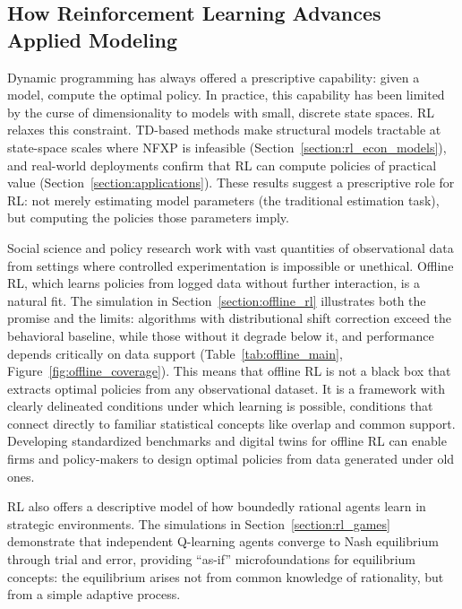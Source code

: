 \subsection{How Reinforcement Learning Advances Applied Modeling}

Dynamic programming has always offered a prescriptive capability: given a model, compute the optimal policy. In practice, this capability has been limited by the curse of dimensionality to models with small, discrete state spaces. RL relaxes this constraint. TD-based methods make structural models tractable at state-space scales where NFXP is infeasible (Section~\ref{section:rl_econ_models}), and real-world deployments confirm that RL can compute policies of practical value (Section~\ref{section:applications}). These results suggest a prescriptive role for RL: not merely estimating model parameters (the traditional estimation task), but computing the policies those parameters imply.

Social science and policy research work with vast quantities of observational data from settings where controlled experimentation is impossible or unethical. Offline RL, which learns policies from logged data without further interaction, is a natural fit. The simulation in Section~\ref{section:offline_rl} illustrates both the promise and the limits: algorithms with distributional shift correction exceed the behavioral baseline, while those without it degrade below it, and performance depends critically on data support (Table~\ref{tab:offline_main}, Figure~\ref{fig:offline_coverage}). This means that offline RL is not a black box that extracts optimal policies from any observational dataset. It is a framework with clearly delineated conditions under which learning is possible, conditions that connect directly to familiar statistical concepts like overlap and common support. Developing standardized benchmarks and digital twins for offline RL can enable firms and policy-makers to design optimal policies from data generated under old ones.

RL also offers a descriptive model of how boundedly rational agents learn in strategic environments. The simulations in Section~\ref{section:rl_games} demonstrate that independent Q-learning agents converge to Nash equilibrium through trial and error, providing ``as-if'' microfoundations for equilibrium concepts: the equilibrium arises not from common knowledge of rationality, but from a simple adaptive process.

